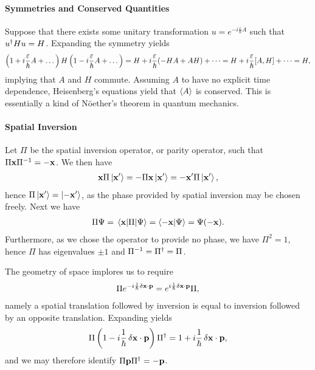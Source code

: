 \paragraph{Symmetries and Conserved Quantities}
Suppose that there exists some unitary transformation $u = e^{-i\frac{\varepsilon}{\hbar}A}$ such that $u^{\dagger}Hu = H$. Expanding the symmetry yields
\begin{align*}
	\left(1 + i\frac{\varepsilon}{\hbar}A + \dots\right)H\left(1 - i\frac{\varepsilon}{\hbar}A + \dots\right) = H + i\frac{\varepsilon}{\hbar}(-HA + AH) + \dots = H + i\frac{\varepsilon}{\hbar}\comm{A}{H} + \dots = H,
\end{align*}
implying that $A$ and $H$ commute. Assuming $A$ to have no explicit time dependence, Heisenberg's equations yield that $\expval{A}$ is conserved. This is essentially a kind of Nöether's theorem in quantum mechanics.

\paragraph{Spatial Inversion}
Let $\Pi$ be the spatial inversion operator, or parity operator, such that $\Pi\vb{x}\Pi^{-1} = -\vb{x}$. We then have
\begin{align*}
	\vb{x}\Pi\ket{\vb{x}^{\prime}} = -\Pi\vb{x}\ket{\vb{x}^{\prime}} = -\vb{x}^{\prime}\Pi\ket{\vb{x}^{\prime}},
\end{align*}
hence $\Pi\ket{\vb{x}^{\prime}} = \ket{-\vb{x}^{\prime}}$, as the phase provided by spatial inversion may be chosen freely. Next we have
\begin{align*}
	\Pi\Psi = \mel{\vb{x}}{\Pi}{\Psi} = \braket{-\vb{x}}{\Psi} = \Psi(-\vb{x}).
\end{align*}
Furthermore, as we chose the operator to provide no phase, we have $\Pi^{2} = 1$, hence $\Pi$ has eigenvalues $\pm 1$ and $\Pi^{-1} = \Pi^{\dagger} = \Pi$.

The geometry of space implores us to require
\begin{align*}
	\Pi e^{-i\frac{1}{\hbar}\var{\vb{x}}\cdot\vb{p}} = e^{i\frac{1}{\hbar}\var{\vb{x}}\cdot\vb{p}}\Pi,
\end{align*}
namely a spatial translation followed by inversion is equal to inversion followed by an opposite translation. Expanding yields
\begin{align*}
	\Pi\left(1 -i\frac{1}{\hbar}\var{\vb{x}}\cdot\vb{p}\right)\Pi^{\dagger} = 1 + i\frac{1}{\hbar}\var{\vb{x}}\cdot\vb{p},
\end{align*}
and we may therefore identify $\Pi\vb{p}\Pi^{\dagger} = -\vb{p}$.

